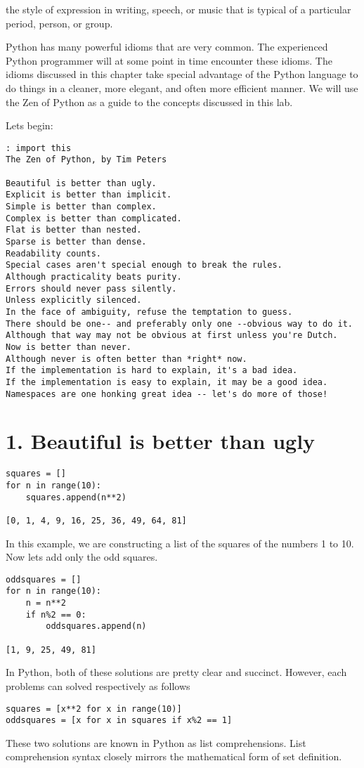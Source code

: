\label{lab:Extensions_Idioms}


\begin{definition}[Idiom]
the style of expression in writing, speech, or music that is typical of a particular period, person, or group.
\end{definition}

Python has many powerful idioms that are very common.  The experienced Python programmer will at some point in time encounter these idioms.  The idioms discussed in this chapter take special advantage of the Python language to do things in a cleaner, more elegant, and often more efficient manner.  We will use the Zen of Python as a guide to the concepts discussed in this lab.

Lets begin:
\begin{lstlisting}
: import this
The Zen of Python, by Tim Peters

Beautiful is better than ugly.
Explicit is better than implicit.
Simple is better than complex.
Complex is better than complicated.
Flat is better than nested.
Sparse is better than dense.
Readability counts.
Special cases aren't special enough to break the rules.
Although practicality beats purity.
Errors should never pass silently.
Unless explicitly silenced.
In the face of ambiguity, refuse the temptation to guess.
There should be one-- and preferably only one --obvious way to do it.
Although that way may not be obvious at first unless you're Dutch.
Now is better than never.
Although never is often better than *right* now.
If the implementation is hard to explain, it's a bad idea.
If the implementation is easy to explain, it may be a good idea.
Namespaces are one honking great idea -- let's do more of those!
\end{lstlisting}

\section*{1. Beautiful is better than ugly}
\begin{lstlisting}
squares = []
for n in range(10):
    squares.append(n**2)
    
[0, 1, 4, 9, 16, 25, 36, 49, 64, 81]
\end{lstlisting}
In this example, we are constructing a list of the squares of the numbers 1 to 10.
Now lets add only the odd squares.
\begin{lstlisting}
oddsquares = []
for n in range(10):
    n = n**2
    if n%2 == 0:
        oddsquares.append(n)
        
[1, 9, 25, 49, 81]
\end{lstlisting}
In Python, both of these solutions are pretty clear and succinct.
However, each problems can solved respectively as follows
\begin{lstlisting}
squares = [x**2 for x in range(10)]
oddsquares = [x for x in squares if x%2 == 1]
\end{lstlisting}
These two solutions are known in Python as list comprehensions.
List comprehension syntax closely mirrors the mathematical form of set definition.

